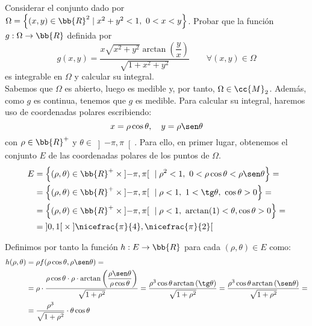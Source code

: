 \begin{ejercicio}
    Considerar el conjunto dado por $\Omega=\left\{\left(x,y\right)\in \bb{R}^2 \mid x^2 + y^2 < 1,~0<x<y\right\}$.
    Probar que la función
    $g:\Omega\to \bb{R}$ definida por
    \begin{equation*}
        g(x,y) = \dfrac{x\sqrt{x^2+y^2}\arctan\left(\dfrac{y}{x}\right)}{\sqrt{1+x^2+y^2}}\qquad \forall (x,y)\in \Omega
    \end{equation*}
    es integrable en $\Omega$ y calcular su integral.\\

    Sabemos que $\Omega$ es abierto, luego es medible y, por tanto, $\Omega\in \cc{M}_2$. Además, como $g$ es continua, tenemos que $g$ es medible.
    Para calcular su integral, haremos uso de coordenadas polares escribiendo:
    \begin{equation*}
        x = \rho\cos\theta, \quad y = \rho\sen\theta
    \end{equation*}
    con $\rho\in \bb{R}^+$ y $\theta\in \left]-\pi, \pi\right[$. Para ello, en primer lugar, obtenemos el conjunto $E$ de las coordenadas polares de los puntos de $\Omega$.
    \begin{align*}
        E &= \left\{ (\rho, \theta) \in \bb{R}^+\times \left]-\pi, \pi\right[ ~\mid \rho^2 < 1,~0<\rho\cos\theta<\rho\sen\theta \right\} =\\
        &= \left\{ (\rho, \theta) \in \bb{R}^+\times \left]-\pi, \pi\right[ ~\mid \rho < 1,~1<\tg\theta,~\cos\theta>0 \right\} =\\
        &= \left\{ (\rho, \theta) \in \bb{R}^+\times \left]-\pi, \pi\right[ ~\mid \rho < 1,~\arctan(1)<\theta,\cos\theta>0\right\} =\\
        &= \left]0, 1\right[\times \left]\nicefrac{\pi}{4}, \nicefrac{\pi}{2}\right[
    \end{align*}

    Definimos por tanto la función $h: E \to \bb{R}$ para cada $(\rho, \theta) \in E$ como:
    \begin{align*}
        h(\rho, \theta) &= \rho f(\rho\cos\theta, \rho\sen\theta)=\\
        &= \rho\cdot \dfrac{\rho\cos\theta\cdot \rho \cdot \arctan\left(\dfrac{\rho\sen\theta}{\rho\cos\theta}\right)}{\sqrt{1+\rho^2}}
        = \dfrac{\rho^3\cos\theta\arctan\left(\tg\theta\right)}{\sqrt{1+\rho^2}} = \dfrac{\rho^3\cos\theta\arctan\left(\sen\theta\right)}{\sqrt{1+\rho^2}} =\\
        &= \dfrac{\rho^3}{\sqrt{1+\rho^2}}\cdot \theta\cos\theta
    \end{align*}


\end{ejercicio}
